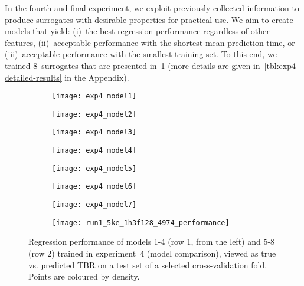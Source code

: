 In the fourth and final experiment, we exploit previously collected information
to produce surrogates with desirable properties for practical use. We
aim to create models that yield: (i)~the best regression performance regardless
of other features, (ii)~acceptable performance with the shortest mean
prediction time, or (iii)~acceptable performance with the smallest training set.
To this end, we trained 8~surrogates that are presented in~\cref{fig:reg-performance}
(more details are given in~\cref{tbl:exp4-detailed-results} in the Appendix).

\begin{figure}[h]
	\centering
	\begin{subfigure}[b]{0.25\textwidth}
		\centering
		\texttt{[image: exp4\_model1]}
	\end{subfigure}\hfill%
	\begin{subfigure}[b]{0.25\textwidth}
		\centering
		\texttt{[image: exp4\_model2]}
	\end{subfigure}\hfill%
	\begin{subfigure}[b]{0.25\textwidth}
		\centering
		\texttt{[image: exp4\_model3]}
	\end{subfigure}\hfill%
	\begin{subfigure}[b]{0.25\textwidth}
		\centering
		\texttt{[image: exp4\_model4]}
	\end{subfigure}

	\begin{subfigure}[b]{0.25\textwidth}
		\centering
		\texttt{[image: exp4\_model5]}
	\end{subfigure}\hfill%
	\begin{subfigure}[b]{0.25\textwidth}
		\centering
		\texttt{[image: exp4\_model6]}
	\end{subfigure}\hfill%
	\begin{subfigure}[b]{0.25\textwidth}
		\centering
		\texttt{[image: exp4\_model7]}
	\end{subfigure}\hfill%
	\begin{subfigure}[b]{0.25\textwidth}
		\centering
		\texttt{[image: run1\_5ke\_1h3f128\_4974\_performance]}
	\end{subfigure}
	\caption{Regression performance of models 1-4 (row 1, from the left) and 5-8
		(row 2) trained in experiment~4 (model comparison), viewed
		as true vs. predicted TBR on a test set of a selected cross-validation
		fold. Points are coloured by density.}
	\label{fig:reg-performance}
\end{figure}

